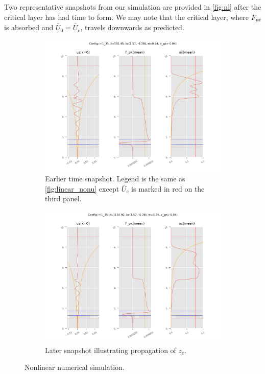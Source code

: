 \documentclass[twocolumn,
        usenames, %
        dvipsnames %
    ]{revtex4-1}%
\begin{document}
Two representative snapshots from our simulation are provided in
\autoref{fig:nl} after the critical layer has had time to form. We may note that
the critical layer, where $F_{px}$ is absorbed and $\bar{U}_0 = \bar{U}_c$,
travels downwards as predicted.
\begin{figure}[h]
    \centering
    \begin{subfigure}{0.5\textwidth}
        \centering
        \includegraphics[width=\textwidth]{plots/nl35_1.png}
        \caption{Earlier time snapshot. Legend is the same as
        \autoref{fig:linear_nonu} except $\bar{U}_c$ is marked in red on the
        third panel.}
    \end{subfigure}

    \begin{subfigure}{0.5\textwidth}
        \centering
        \includegraphics[width=\textwidth]{plots/nl35_2.png}
        \caption{Later snapshot illustrating propagation of $z_c$.}
    \end{subfigure}
    \caption{Nonlinear numerical simulation.}\label{fig:nl}
\end{figure}
\end{document}
